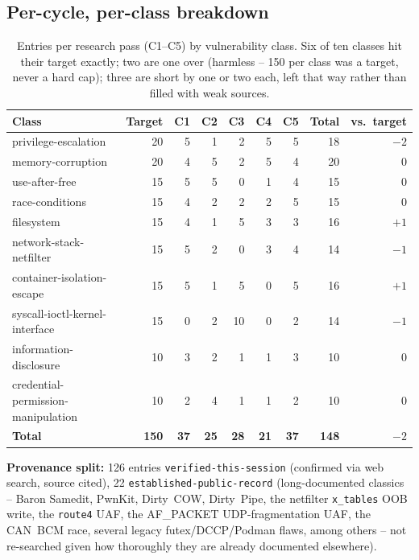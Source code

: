\documentclass[11pt,a4paper]{article}
\begin{document}
\subsection*{Per-cycle, per-class breakdown}

\begin{table}[h]
\centering
\scriptsize
\begin{tabular}{@{}l r r r r r r r r@{}}
\toprule
\textbf{Class} & \textbf{Target} & \textbf{C1} & \textbf{C2} & \textbf{C3} & \textbf{C4} & \textbf{C5} & \textbf{Total} & \textbf{vs.\ target} \\
\midrule
privilege-escalation               & 20 & 5 & 1 & 2 & 5 & 5 & 18 & $-2$ \\
memory-corruption                  & 20 & 4 & 5 & 2 & 5 & 4 & 20 & $0$ \\
use-after-free                     & 15 & 5 & 5 & 0 & 1 & 4 & 15 & $0$ \\
race-conditions                    & 15 & 4 & 2 & 2 & 2 & 5 & 15 & $0$ \\
filesystem                         & 15 & 4 & 1 & 5 & 3 & 3 & 16 & $+1$ \\
network-stack-netfilter            & 15 & 5 & 2 & 0 & 3 & 4 & 14 & $-1$ \\
container-isolation-escape         & 15 & 5 & 1 & 5 & 0 & 5 & 16 & $+1$ \\
syscall-ioctl-kernel-interface     & 15 & 0 & 2 & 10& 0 & 2 & 14 & $-1$ \\
information-disclosure             & 10 & 3 & 2 & 1 & 1 & 3 & 10 & $0$ \\
credential-permission-manipulation & 10 & 2 & 4 & 1 & 1 & 2 & 10 & $0$ \\
\midrule
\textbf{Total} & \textbf{150} & \textbf{37} & \textbf{25} & \textbf{28} & \textbf{21} & \textbf{37} & \textbf{148} & \textbf{$-2$} \\
\bottomrule
\end{tabular}
\caption{Entries per research pass (C1--C5) by vulnerability class. Six of
ten classes hit their target exactly; two are one over (harmless -- 150
per class was a target, never a hard cap); three are short by one or two
each, left that way rather than filled with weak sources.}
\end{table}

\textbf{Provenance split:} 126 entries \texttt{verified-this-session}
(confirmed via web search, source cited), 22 \texttt{established-public-record}
(long-documented classics -- Baron Samedit, PwnKit, Dirty~COW, Dirty~Pipe,
the netfilter \texttt{x\_tables} OOB write, the \texttt{route4} UAF, the
AF\_PACKET UDP-fragmentation UAF, the CAN~BCM race, several legacy
futex/DCCP/Podman flaws, among others -- not re-searched given how
thoroughly they are already documented elsewhere).
\end{document}
